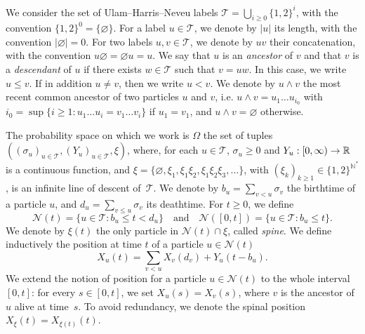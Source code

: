 \documentclass[10pt]{amsart}
\theoremstyle{definition}\newtheorem{defi}[theo]{Definition}\newtheorem{rema}[theo]{Remark}\newtheorem{exam}[theo]{Example}\newtheorem{exem}[theo]{Example}\newtheorem{nota}[theo]{Notation}
\newcommand{\N}{\mathbb{N}}
\newcommand{\R}{\mathbb{R}}
\newcommand\1{\mathds{1}}
\newcommand{\cN}{\mathcal{N}}
\newcommand{\cT}{\mathcal{T}}
\renewcommand*{\to}{\mathchoice{\longrightarrow}{\rightarrow}{\rightarrow}{\rightarrow}}
\begin{document}
We consider the set of Ulam--Harris--Neveu labels $\cT = \bigcup_{i \geq 0} \{1, 2\}^i$, with the convention $\{1, 2\}^0 = \{\varnothing\}$. For a label $u \in \cT$, we denote by $|u|$ its length, with the convention $|\varnothing| = 0$. For two labels $u, v \in \cT$, we denote by $uv$ their concatenation, with the convention $u \varnothing = \varnothing u = u$. We say that $u$ is an \emph{ancestor} of $v$ and that $v$ is a \emph{descendant} of $u$ if there exists $w \in \cT$ such that $v = uw$. In this case, we write $u \leq v$. If in addition $u \neq v$, then we write $u < v$. We denote by $u \wedge v$ the most recent common ancestor of two particles $u$ and $v$, i.e. $u \wedge v = u_1 \dots u_{i_0}$ with $i_0 = \sup\{i \geq 1 : u_1 \dots u_i = v_1 \dots v_i\}$ if $u_1 = v_1$, and $u \wedge v = \varnothing$ otherwise.

The probability space on which we work is $\Omega$ the set of tuples $((\sigma_u)_{u \in \cT}, (Y_u)_{u \in \cT}, \xi)$, where, for each $u \in \cT$, $\sigma_u \geq 0$ and $Y_u : [0, \infty) \to \R$ is a continuous function, and $\xi = \{ \varnothing, \xi_1, \xi_1\xi_2, \xi_1\xi_2\xi_3, \dots \}$, with $(\xi_k)_{k\geq 1}\in \{1,2\}^{\N^*}$, is an infinite line of descent of~$\cT$. We denote by $b_u = \sum_{v < u} \sigma_v$ the birthtime of a particle $u$, and $d_u = \sum_{v \leq u} \sigma_v$ its deathtime. For $t \geq 0$, we define
\begin{equation*}
\cN(t) = \{u \in \cT : b_u \leq t < d_u\} \quad \text{and} \quad \cN([0, t]) = \{u \in \cT : b_u \leq t\}.
\end{equation*}
We denote by $\xi(t)$ the only particle in $\cN(t) \cap \xi$, called \emph{spine}. We define inductively the position at time $t$ of a particle $u \in \cN(t)$
\begin{equation*}
X_u(t) = \sum_{v < u} X_v(d_v) + Y_u(t - b_u).
\end{equation*}
We extend the notion of position for a particle $u \in \cN(t)$ to the whole interval $[0, t]$: for every $s \in [0, t]$, we set $X_u(s) = X_v(s)$, where $v$ is the ancestor of $u$ alive at time~$s$. To avoid redundancy, we denote the spinal position $X_\xi(t) = X_{\xi(t)}(t)$.
\end{document}
